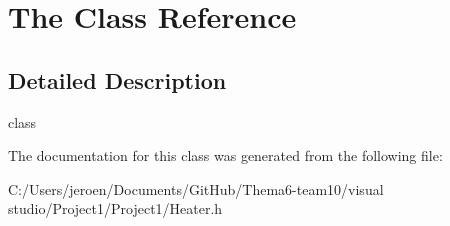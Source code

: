\hypertarget{class_the}{}\section{The Class Reference}
\label{class_the}


\subsection{Detailed Description}
class 

The documentation for this class was generated from the following file\+:\begin{DoxyCompactItemize}
\item 
C\+:/\+Users/jeroen/\+Documents/\+Git\+Hub/\+Thema6-\/team10/visual studio/\+Project1/\+Project1/Heater.\+h\end{DoxyCompactItemize}

